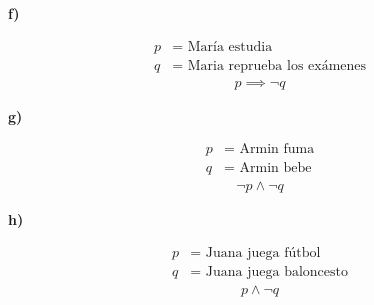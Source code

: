 \textbf{f)}
\vspace{-10px}
\begin{multicols}{2}
    \noindent
    \begin{align*}
        p &= \text{ María estudia}\\
        q &= \text{ Maria reprueba los exámenes}
    \end{align*}
    \columnbreak
    \begin{align*}
        p\implies \neg q
    \end{align*}
\end{multicols}
\textbf{g)}
\vspace{-10px}
\begin{multicols}{2}
    \noindent
    \begin{align*}
        p &= \text{ Armin fuma}\\
        q &= \text{ Armin bebe}
    \end{align*}
    \columnbreak
    \begin{align*}
        \neg p\land \neg q
    \end{align*}
\end{multicols}
\textbf{h)}
\vspace{-10px}
\begin{multicols}{2}
    \noindent
    \begin{align*}
        p &= \text{ Juana juega fútbol}\\
        q &= \text{ Juana juega baloncesto}
    \end{align*}
    \columnbreak
    \begin{align*}
        p\land \neg q
    \end{align*}
\end{multicols}

